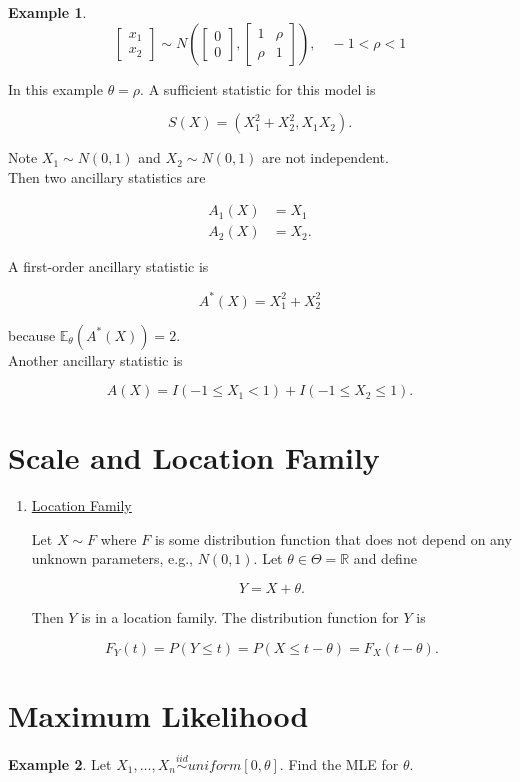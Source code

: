 \documentclass[12pt]{article}
\theoremstyle{definition}
\newtheorem*{example}{Example}
\begin{document}
\begin{example}

\begin{equation*}
\begin{bmatrix}
x_1 \\
x_2
\end{bmatrix}
\sim
N \left(
\begin{bmatrix}
0 \\
0
\end{bmatrix},
\begin{bmatrix}
1 & \rho \\
\rho & 1
\end{bmatrix}
\right),
\quad
-1 < \rho < 1
\end{equation*}

In this example $\theta = \rho$. A sufficient statistic for this model is

$$ S(X) = (X_1^2 + X_2^2, X_1 X_2). $$

Note $X_1 \sim N(0, 1)$ and $X_2 \sim N(0, 1)$ are not independent. \\

Then two ancillary statistics are

\begin{align*}
A_1(X) &= X_1 \\
A_2(X) &= X_2.
\end{align*}

A first-order ancillary statistic is

$$ A^* (X) = X_1^2 + X_2^2 $$

because $\mathbb{E}_{\theta} (A^* (X) ) = 2$.\\

Another ancillary statistic is 

$$ A(X) = I(-1 \leq X_1 < 1) + I(-1 \leq X_2 \leq 1). $$

\end{example}

\section{Scale and Location Family}

\begin{enumerate}

\item \underline{Location Family}

Let $X \sim F$ where $F$ is some distribution function that does not depend
on any unknown parameters, e.g., $N(0,1)$. Let $\theta \in \Theta = \mathbb{R}$ and
define

$$ Y = X + \theta. $$

Then $Y$ is in a location family. The distribution function for $Y$ is

$$ F_Y(t) = P(Y \leq t) = P(X \leq t - \theta) = F_X(t - \theta). $$

\end{enumerate}

\section{Maximum Likelihood}

\begin{example}
Let $X_1, \ldots, X_n \overset{iid}{\sim} uniform[0,\theta]$. Find the MLE for $\theta$.
\end{example}
\end{document}

